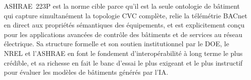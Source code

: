 ASHRAE~223P est la norme cible parce qu'il est la seule ontologie de bâtiment qui capture simultanément la topologie CVC complète, relie la télémétrie BACnet en direct aux propriétés sémantiques des équipements, et est explicitement conçu pour les applications avancées de contrôle des bâtiments et de services au réseau électrique.
Sa structure formelle et son soutien institutionnel par le DOE, le NREL et l'ASHRAE en font le fondement d'interopérabilité à long terme le plus crédible, et sa richesse en fait le banc d'essai le plus exigeant et le plus instructif pour évaluer les modèles de bâtiments générés par l'IA.
